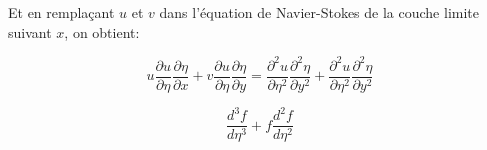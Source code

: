 \documentclass[french]{article}
\begin{document}
Et en remplaçant $u$ et $v$ dans l'équation de Navier-Stokes de la couche limite suivant $x$, on obtient:


\begin{equation*}	
	u\frac{\partial u}{\partial \eta}
	\frac{\partial \eta}{\partial x} + 
	v\frac{\partial u}{\partial \eta} 
	\frac{\partial \eta}{\partial y}
	=
	\frac{\partial^{2} u}{\partial  \eta^{2}}
	\frac{\partial^{2} \eta}{\partial  y^{2}} +
	\frac{\partial^{2} u}{\partial  \eta^{2}}
	\frac{\partial^{2} \eta}{\partial  y^{2}}
\end{equation*}

\begin{equation}	
	\frac{d^{3}f}{d\eta^{3}} + f\frac{d^{2} f}{d\eta^{2}}
\end{equation}
\end{document}
